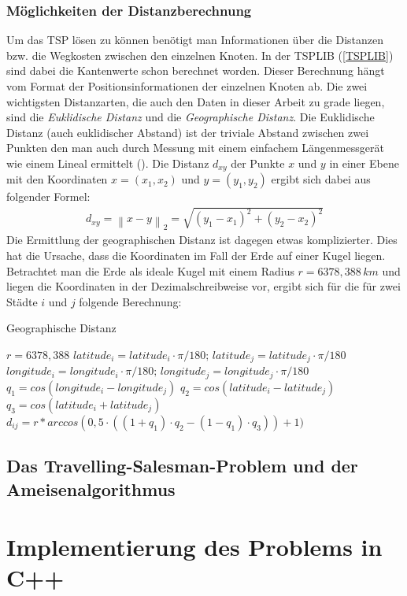\documentclass[doktyp=barbeit, sprache=german]{TUBAFarbeiten}
\begin{document}
\subsubsection{Möglichkeiten der Distanzberechnung}
Um das TSP lösen zu können benötigt man Informationen über die Distanzen bzw. die Wegkosten zwischen den einzelnen Knoten. In der TSPLIB (\ref{TSPLIB}) sind dabei die Kantenwerte schon berechnet worden. Dieser Berechnung hängt vom Format der Positionsinformationen der einzelnen Knoten ab. Die zwei wichtigsten Distanzarten, die auch den Daten in dieser Arbeit zu grade liegen, sind die \textit{Euklidische Distanz} und die \textit{Geographische Distanz}. Die Euklidische Distanz (auch euklidischer Abstand) ist der triviale Abstand zwischen zwei Punkten den man auch durch Messung mit einem einfachem Längenmessgerät wie einem Lineal ermittelt (\cite{Distanz}). Die Distanz $d_{xy}$ der Punkte $x$ und $y$ in einer Ebene mit den Koordinaten $x = (x_1, x_2)$ und $y = (y_1, y_2)$ ergibt sich dabei aus folgender Formel:
\begin{align}
\label{eq:Euclid}
d_{xy} = \left\| x - y \right\|_2 = \sqrt{{(y_1-x_1)}^2+{(y_2-x_2)}^2}
\end{align}
Die Ermittlung der geographischen Distanz ist dagegen etwas komplizierter. Dies hat die Ursache, dass die Koordinaten im Fall der Erde auf einer Kugel liegen. Betrachtet man die Erde als ideale Kugel mit einem Radius $r = 6378,388 \,km$ und liegen die Koordinaten in der Dezimalschreibweise vor, ergibt sich für die für zwei Städte $i$ und $j$ folgende Berechnung:
\begin{algorithm}
\caption{Geographische Distanz}
\label{geodistance}
\begin{algorithmic}[1]
\State $r = 6378,388$
\State $latitude_i = latitude_i \cdot \pi / 180; \,latitude_j = latitude_j \cdot \pi / 180$
\State $longitude_i = longitude_i \cdot \pi / 180;\, longitude_j =longitude_j \cdot \pi / 180$
\State $q_1 = cos(longitude_i - longitude_j)$
\State $q_2 = cos(latitude_i - latitude_j)$
\State $q_3 = cos(latitude_i + latitude_j)$
\State \textbf{$d_{ij} = r * arccos(0,5 \cdot ((1 + q_1) \cdot q_2 - (1 - q_1) \cdot q_3)) + 1)$}
\end{algorithmic}
\end{algorithm}
\subsection{Das Travelling-Salesman-Problem und der Ameisenalgorithmus}
\section{Implementierung des Problems in C++}
\end{document}

